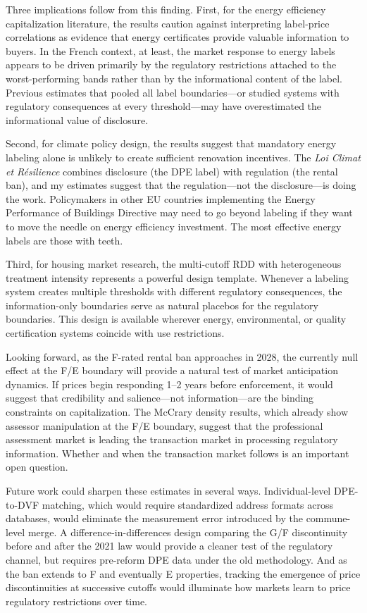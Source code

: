 \documentclass[12pt]{article}
\begin{document}
Three implications follow from this finding. First, for the energy efficiency capitalization literature, the results caution against interpreting label-price correlations as evidence that energy certificates provide valuable information to buyers. In the French context, at least, the market response to energy labels appears to be driven primarily by the regulatory restrictions attached to the worst-performing bands rather than by the informational content of the label. Previous estimates that pooled all label boundaries---or studied systems with regulatory consequences at every threshold---may have overestimated the informational value of disclosure.

Second, for climate policy design, the results suggest that mandatory energy labeling alone is unlikely to create sufficient renovation incentives. The \textit{Loi Climat et R\'esilience} combines disclosure (the DPE label) with regulation (the rental ban), and my estimates suggest that the regulation---not the disclosure---is doing the work. Policymakers in other EU countries implementing the Energy Performance of Buildings Directive may need to go beyond labeling if they want to move the needle on energy efficiency investment. The most effective energy labels are those with teeth.

Third, for housing market research, the multi-cutoff RDD with heterogeneous treatment intensity represents a powerful design template. Whenever a labeling system creates multiple thresholds with different regulatory consequences, the information-only boundaries serve as natural placebos for the regulatory boundaries. This design is available wherever energy, environmental, or quality certification systems coincide with use restrictions.

Looking forward, as the F-rated rental ban approaches in 2028, the currently null effect at the F/E boundary will provide a natural test of market anticipation dynamics. If prices begin responding 1--2 years before enforcement, it would suggest that credibility and salience---not information---are the binding constraints on capitalization. The McCrary density results, which already show assessor manipulation at the F/E boundary, suggest that the professional assessment market is leading the transaction market in processing regulatory information. Whether and when the transaction market follows is an important open question.

Future work could sharpen these estimates in several ways. Individual-level DPE-to-DVF matching, which would require standardized address formats across databases, would eliminate the measurement error introduced by the commune-level merge. A difference-in-differences design comparing the G/F discontinuity before and after the 2021 law would provide a cleaner test of the regulatory channel, but requires pre-reform DPE data under the old methodology. And as the ban extends to F and eventually E properties, tracking the emergence of price discontinuities at successive cutoffs would illuminate how markets learn to price regulatory restrictions over time.
\end{document}
